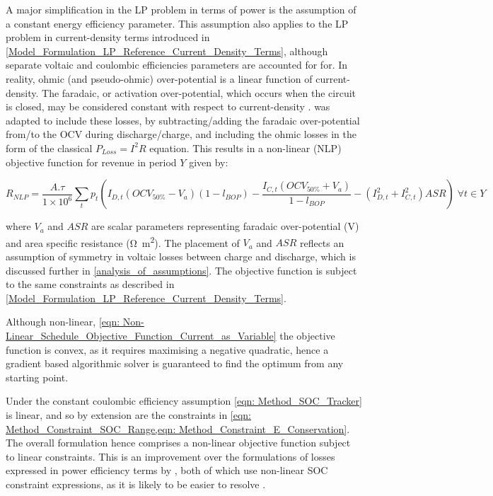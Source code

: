 \documentclass[preprint,3p,review,authoryear,10pt]{elsarticle}
\begin{document}
A major simplification in the LP problem in terms of power is the assumption of a constant energy efficiency parameter. This assumption also applies to the LP problem in current-density terms introduced in \cref{Model_Formulation_LP_Reference_Current_Density_Terms}, although separate voltaic and coulombic efficiencies parameters are accounted for for. In reality, ohmic (and pseudo-ohmic) over-potential is a linear function of current-density. The faradaic, or activation over-potential, which occurs when the circuit is closed, may be considered constant with respect to current-density \cite{Aaron2011}.  was adapted to include these losses, by subtracting/adding the faradaic over-potential from/to the OCV during discharge/charge, and including the ohmic losses in the form of the classical $P_{Loss} = I^2R$ equation. This results in a non-linear (NLP) objective function for revenue in period $Y$ given by:

\begin{equation}
\label{eqn: Non-Linear_Schedule_Objective_Function_Current_as_Variable}
R_{NLP} = \frac{A.\tau}{1\times 10^{6}}\sum_{t}p_{t}(I_{D, t}(OCV_{50\%} - V_a)(1-l_{BOP}) - \frac{I_{C, t}(OCV_{50\%} + V_a)}{1-l_{BOP}} - (I_{D,t}^{2} + I_{C,t}^{2})ASR) \; \forall t \in Y
\end{equation}


where $V_a$ and $ASR$ are scalar parameters representing faradaic over-potential (\si{\volt}) and area specific resistance (\si{\ohm\square\meter}). The placement of $V_a$ and $ASR$ reflects an assumption of symmetry in voltaic losses between charge and discharge, which is discussed further in \cref{analysis_of_assumptions}. The objective function is subject to the same constraints as described in \cref{Model_Formulation_LP_Reference_Current_Density_Terms}.

Although non-linear, \cref{eqn: Non-Linear_Schedule_Objective_Function_Current_as_Variable} the objective function is convex, as it requires maximising a negative quadratic, hence a gradient based algorithmic solver is guaranteed to find the optimum from any starting point. 

Under the constant coulombic efficiency assumption \cref{eqn: Method_SOC_Tracker} is linear, and so by extension are the constraints in \cref{eqn: Method_Constraint_SOC_Range,eqn: Method_Constraint_E_Conservation}.  The overall formulation hence comprises a non-linear objective function subject to linear constraints. This is an improvement over the formulations of losses expressed in power efficiency terms by \cite{Nguyen2015,Sarker2017}, both of which use non-linear SOC constraint expressions, as it is likely to be easier to resolve \cite{Hart2017}.
\end{document}
